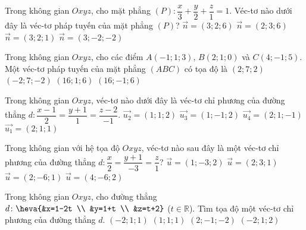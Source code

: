 \begin{ex}%
	Trong không gian $Oxyz$, cho mặt phẳng $(P) \colon \dfrac{x}{3}+\dfrac{y}{2}+\dfrac{z}{1}=1$. Véc-tơ nào dưới đây là véc-tơ pháp tuyến của mặt phẳng $(P)$?
	\choice
	{$\overrightarrow{n}=(3;2;6)$}
	{\True $\overrightarrow{n}=(2;3;6)$}
	{$\overrightarrow{n}=(3;2;1)$}
	{$\overrightarrow{n}=(3;-2;-2)$}
\end{ex}

\begin{ex}%
	Trong không gian $Oxyz$, cho các điểm $A(-1;1;3)$, $B(2;1;0)$ và $C(4;-1;5)$. Một véc-tơ pháp tuyến của mặt phẳng $(ABC)$ có tọa độ là
	\choice
	{\True $(2;7;2)$}
	{$(-2;7;-2)$}
	{$(16;1;6)$}
	{$(16;-1;6)$}
\end{ex}

\begin{ex}%
		Trong không gian $Oxyz$, véc-tơ nào dưới đây là véc-tơ chỉ phương của đường thẳng $d \colon \dfrac{x-1}{2}=\dfrac{y+1}{1}=\dfrac{z-2}{-1}$.
	\choice
	{$\overrightarrow{u_2}=(1;1;2)$}
	{$\overrightarrow{u_3}=(1;-1;2)$}
	{\True $\overrightarrow{u_4}=(2;1;-1)$}
	{$\overrightarrow{u_1}=(2;1;1)$}
\end{ex}

\begin{ex}%
	Trong không gian với hệ tọa độ $Oxyz$, véc-tơ nào sau đây là một véc-tơ chỉ phương của đường thẳng $d \colon \dfrac{x}{2}=\dfrac{y+1}{-3}=\dfrac{z}{1}$?
	\choice
	{$\overrightarrow{u}=(1;-3;2)$}
	{$\overrightarrow{u}=(2;3;1)$}
	{$\overrightarrow{u}=(2;-6;1)$}
	{\True $\overrightarrow{u}=(4;-6;2)$}
\end{ex}

\begin{ex}%
	Trong không gian $Oxyz$, cho đường thẳng $d \colon \heva{&x=1-2t \\ &y=1+t \\ &z=t+2}$ ($t\in \mathbb{R}$). Tìm tọa độ một véc-tơ chỉ phương của đường thẳng $d$.
	\choice
	{\True $(-2;1;1)$}
	{$(1;1;1)$}
	{$(2;-1;-2)$}
	{$(-2;1;2)$}
\end{ex}

